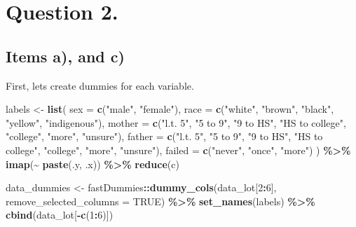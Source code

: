 \documentclass[
]{article}
\newenvironment{Shaded}{\begin{snugshade}}{\end{snugshade}}
\newcommand{\AttributeTok}[1]{\textcolor[rgb]{0.13,0.29,0.53}{#1}}
\newcommand{\ConstantTok}[1]{\textcolor[rgb]{0.56,0.35,0.01}{#1}}
\newcommand{\DecValTok}[1]{\textcolor[rgb]{0.00,0.00,0.81}{#1}}
\newcommand{\FunctionTok}[1]{\textcolor[rgb]{0.13,0.29,0.53}{\textbf{#1}}}
\newcommand{\NormalTok}[1]{#1}
\newcommand{\OtherTok}[1]{\textcolor[rgb]{0.56,0.35,0.01}{#1}}
\newcommand{\SpecialCharTok}[1]{\textcolor[rgb]{0.81,0.36,0.00}{\textbf{#1}}}
\newcommand{\StringTok}[1]{\textcolor[rgb]{0.31,0.60,0.02}{#1}}
\begin{document}
\section{Question 2.}\label{question-2.}

\subsection{Items a), and c)}\label{items-a-and-c}

First, lets create dummies for each variable.

\begin{Shaded}
\begin{Highlighting}[]
\NormalTok{labels }\OtherTok{\textless{}{-}} \FunctionTok{list}\NormalTok{(}
  \AttributeTok{sex =} \FunctionTok{c}\NormalTok{(}\StringTok{"male"}\NormalTok{, }\StringTok{"female"}\NormalTok{),}
  \AttributeTok{race =} \FunctionTok{c}\NormalTok{(}\StringTok{"white"}\NormalTok{, }\StringTok{"brown"}\NormalTok{, }\StringTok{"black"}\NormalTok{, }\StringTok{"yellow"}\NormalTok{, }\StringTok{"indigenous"}\NormalTok{),}
  \AttributeTok{mother =} \FunctionTok{c}\NormalTok{(}\StringTok{"l.t. 5"}\NormalTok{, }\StringTok{"5 to 9"}\NormalTok{, }\StringTok{"9 to HS"}\NormalTok{, }\StringTok{"HS to college"}\NormalTok{, }\StringTok{"college"}\NormalTok{, }\StringTok{"more"}\NormalTok{, }\StringTok{"unsure"}\NormalTok{),}
  \AttributeTok{father =} \FunctionTok{c}\NormalTok{(}\StringTok{"l.t. 5"}\NormalTok{, }\StringTok{"5 to 9"}\NormalTok{, }\StringTok{"9 to HS"}\NormalTok{, }\StringTok{"HS to college"}\NormalTok{, }\StringTok{"college"}\NormalTok{, }\StringTok{"more"}\NormalTok{, }\StringTok{"unsure"}\NormalTok{),}
  \AttributeTok{failed =} \FunctionTok{c}\NormalTok{(}\StringTok{"never"}\NormalTok{, }\StringTok{"once"}\NormalTok{, }\StringTok{"more"}\NormalTok{)}
\NormalTok{) }\SpecialCharTok{\%\textgreater{}\%}
  \FunctionTok{imap}\NormalTok{(}\SpecialCharTok{\textasciitilde{}} \FunctionTok{paste}\NormalTok{(.y, .x)) }\SpecialCharTok{\%\textgreater{}\%}
  \FunctionTok{reduce}\NormalTok{(c)}

\NormalTok{data\_dummies }\OtherTok{\textless{}{-}}\NormalTok{ fastDummies}\SpecialCharTok{::}\FunctionTok{dummy\_cols}\NormalTok{(data\_lot[}\DecValTok{2}\SpecialCharTok{:}\DecValTok{6}\NormalTok{], }\AttributeTok{remove\_selected\_columns =} \ConstantTok{TRUE}\NormalTok{) }\SpecialCharTok{\%\textgreater{}\%}
  \FunctionTok{set\_names}\NormalTok{(labels) }\SpecialCharTok{\%\textgreater{}\%}
  \FunctionTok{cbind}\NormalTok{(data\_lot[}\SpecialCharTok{{-}}\FunctionTok{c}\NormalTok{(}\DecValTok{1}\SpecialCharTok{:}\DecValTok{6}\NormalTok{)])}
\end{Highlighting}
\end{Shaded}
\end{document}
